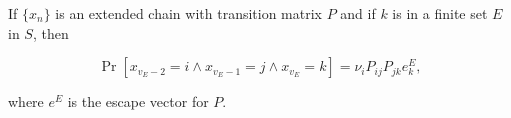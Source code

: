 If $\{x_n\}$ is an extended chain with transition matrix $P$ and if $k$ is in a finite set $E$ in $S$, then

$$\Pr[x_{v_E-2} = i \wedge x_{v_E-1} = j \wedge x_{v_E} = k] = \nu_i P_{ij} P_{jk} e^E_k,$$

where $e^E$ is the escape vector for $P$.
